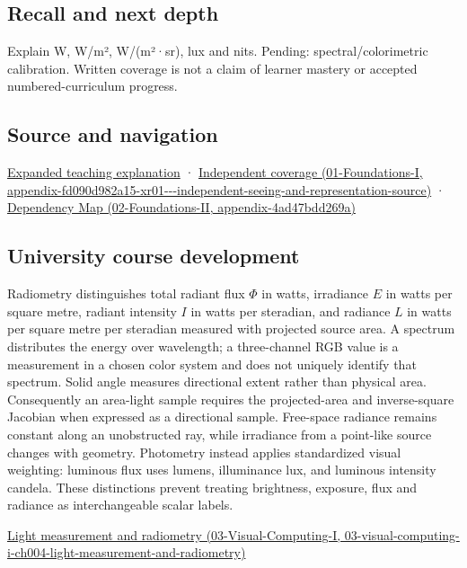 \subsection{Recall and next depth}\label{appendix-215c2570199b-recall-and-next-depth}

Explain W, W/m², W/(m²·sr), lux and nits. Pending: spectral/colorimetric calibration. Written coverage is not a claim of learner mastery or accepted numbered-curriculum progress.

\subsection{Source and navigation}\label{appendix-215c2570199b-source-and-navigation}

\href{Continuous\%20Notes/University\%20-\%20Worlds,\%20Images\%20and\%20Inference\%20-\%20Graphics,\%20Vision\%20and\%20Photography\#Light\%20must\%20become\%20a\%20quantity\%20before\%20it\%20becomes\%20a\%20color}{Expanded teaching explanation} · \href{../01-Foundations-I/main.pdf\#nameddest=appendix-fd090d982a15-xr01---independent-seeing-and-representation-source}{Independent coverage (01-Foundations-I, appendix-fd090d982a15-xr01-\/-\/-independent-seeing-and-representation-source)} · \href{../02-Foundations-II/main.pdf\#nameddest=appendix-4ad47bdd269a}{Dependency Map (02-Foundations-II, appendix-4ad47bdd269a)}

\subsection{University course development}\label{appendix-215c2570199b-university-course-development}

Radiometry distinguishes total radiant flux \(\Phi\) in watts, irradiance \(E\) in watts per square metre, radiant intensity \(I\) in watts per steradian, and radiance \(L\) in watts per square metre per steradian measured with projected source area. A spectrum distributes the energy over wavelength; a three-channel RGB value is a measurement in a chosen color system and does not uniquely identify that spectrum. Solid angle measures directional extent rather than physical area. Consequently an area-light sample requires the projected-area and inverse-square Jacobian when expressed as a directional sample. Free-space radiance remains constant along an unobstructed ray, while irradiance from a point-like source changes with geometry. Photometry instead applies standardized visual weighting: luminous flux uses lumens, illuminance lux, and luminous intensity candela. These distinctions prevent treating brightness, exposure, flux and radiance as interchangeable scalar labels.

\href{../03-Visual-Computing-I/main.pdf\#nameddest=03-visual-computing-i-ch004-light-measurement-and-radiometry}{Light measurement and radiometry (03-Visual-Computing-I, 03-visual-computing-i-ch004-light-measurement-and-radiometry)}
